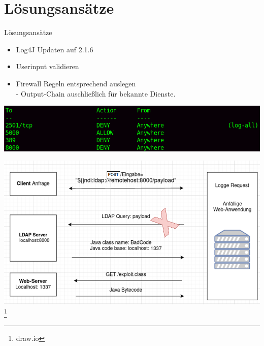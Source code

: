 \documentclass{beamer}
\begin{document}
\section{Lösungsansätze}
\begin{frame}{Lösungsansätze}
\begin{itemize}
 \item Log4J Updaten auf 2.1.6
 \item Userinput validieren
 \item Firewall Regeln entsprechend auslegen\\
 - Output-Chain auschließlich für bekannte Dienste.
 \end{itemize}
 \begin{center}
 \includegraphics[scale=0.35]{outputchainldpa.png}
 \end{center}
 
\end{frame}
\begin{frame}
\begin{center}
\includegraphics[scale=0.35]{firewall.png}\footnote{draw.io}
\end{center}
\end{frame}
\end{document}
